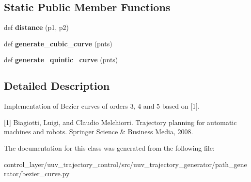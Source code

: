 \subsection*{Static Public Member Functions}
\begin{DoxyCompactItemize}
\item 
\mbox{\label{classuuv__trajectory__generator_1_1path__generator_1_1bezier__curve_1_1BezierCurve_a772bef89a3b771066af31c5f0eba2b20}} 
def {\bfseries distance} (p1, p2)
\item 
\mbox{\label{classuuv__trajectory__generator_1_1path__generator_1_1bezier__curve_1_1BezierCurve_a723a5887df791e2c89ca68b61f49ba45}} 
def {\bfseries generate\+\_\+cubic\+\_\+curve} (pnts)
\item 
\mbox{\label{classuuv__trajectory__generator_1_1path__generator_1_1bezier__curve_1_1BezierCurve_ad7bf32a3ab998dc9db0aae120d9a5a67}} 
def {\bfseries generate\+\_\+quintic\+\_\+curve} (pnts)
\end{DoxyCompactItemize}


\subsection{Detailed Description}
\begin{DoxyVerb}Implementation of Bezier curves of orders 3, 4 and 5 based on [1].

[1] Biagiotti, Luigi, and Claudio Melchiorri. Trajectory planning for 
    automatic machines and robots. Springer Science & Business Media, 2008.
\end{DoxyVerb}
 

The documentation for this class was generated from the following file\+:\begin{DoxyCompactItemize}
\item 
control\+\_\+layer/uuv\+\_\+trajectory\+\_\+control/src/uuv\+\_\+trajectory\+\_\+generator/path\+\_\+generator/bezier\+\_\+curve.\+py\end{DoxyCompactItemize}
